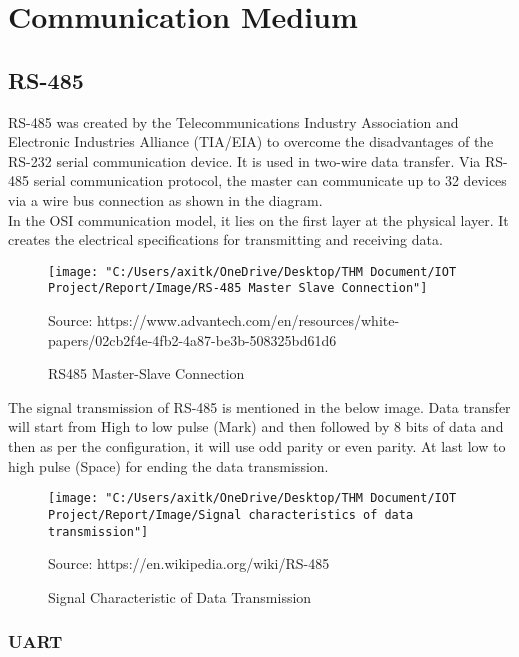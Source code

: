 \documentclass{article}
\begin{document}
	
	\section{Communication Medium}
	
	\subsection{RS-485}
	
	RS-485 was created by the Telecommunications Industry Association and Electronic Industries Alliance (TIA/EIA) to overcome the disadvantages of the RS-232 serial communication device. It is used in two-wire data transfer. Via RS-485 serial communication protocol, the master can communicate up to 32 devices via a wire bus connection as shown in the diagram.
	\\In the OSI communication model, it lies on the first layer at the physical layer. It creates the electrical specifications for transmitting and receiving data.
	
	\begin{figure}[h]
		\centering
		\texttt{[image: "C:/Users/axitk/OneDrive/Desktop/THM Document/IOT Project/Report/Image/RS-485 Master Slave Connection"]}
		\caption{RS485 Master-Slave Connection}
		\small Source:  https://www.advantech.com/en/resources/white-papers/02cb2f4e-4fb2-4a87-be3b-508325bd61d6
	\end{figure}
	
	The signal transmission of RS-485 is mentioned in the below image. Data transfer will start from High to low pulse (Mark) and then followed by 8 bits of data and then as per the configuration, it will use odd parity or even parity. At last low to high pulse (Space) for ending the data transmission.
	\begin{figure}[h]
		\centering
		\texttt{[image: "C:/Users/axitk/OneDrive/Desktop/THM Document/IOT Project/Report/Image/Signal characteristics of data transmission"]}
		\caption{Signal Characteristic of Data Transmission}
		\small Source:  https://en.wikipedia.org/wiki/RS-485
	\end{figure}
	
	\subsubsection{UART}
	
\end{document}

